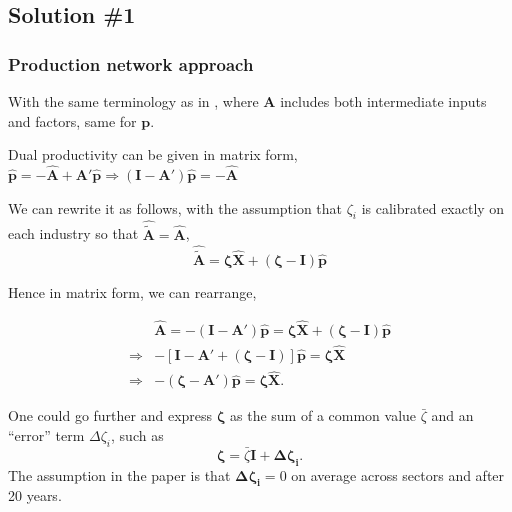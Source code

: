 \documentclass[11pt]{article}
\begin{document}

\subsection{Solution \#1}
\subsubsection{Production network approach}

With the same terminology as in \cite{mcnerneyHowProductionNetworks2022}, where $\mathbf{A}$ includes both intermediate inputs and factors, same for $\mathbf{p}$.

Dual productivity can be given in matrix form,
$   \mathbf{\hat{p}}=-\mathbf{\hat{A}} + \mathbf{A}'\mathbf{\hat{p}} \Rightarrow
 (\mathbf{I}-\mathbf{A}')\mathbf{\hat{p}}=-\mathbf{\hat{A}} $

We can rewrite it as follows, with the assumption that $\zeta_i$ is calibrated exactly on each industry so that $\mathbf{\hat{\tilde{A}}}=\mathbf{\hat{A}}$,
\begin{equation*}
    \mathbf{\hat{\tilde{A}}}=\bm{\zeta} \mathbf{\hat{X}}+(\bm{\zeta}-\mathbf{I})\mathbf{\hat{p}} 
\end{equation*}

Hence in matrix form, we can rearrange,

\begin{align*}
    & \mathbf{\hat{A}}=- (\mathbf{I}-\mathbf{A}')\mathbf{\hat{p}} = \bm{\zeta} \mathbf{\hat{X}}+(\bm{\zeta}-\mathbf{I})\mathbf{\hat{p}} \\
    \Rightarrow& 
    - \left[\mathbf{I}-\mathbf{A}'+(\bm{\zeta}-\mathbf{I})\right]\mathbf{\hat{p}} = \bm{\zeta} \mathbf{\hat{X}} \\
     \Rightarrow &
    - (\bm{\zeta}-\mathbf{A}')\mathbf{\hat{p}} = \bm{\zeta} \mathbf{\hat{X}}.
\end{align*}


One could go further and express $\bm{\zeta}$ as the sum of a common value $\bar{\zeta}$ and an ``error'' term $\Delta \zeta_i$, such as 
\begin{equation*}
    \bm{\zeta}=\bar{\zeta}\mathbf{I}+\bm{\Delta \zeta_i}.
\end{equation*}
The assumption in the paper is that $\bm{\Delta \zeta_i}=0$ on average across sectors and after 20 years.

\vspace{3mm}
\end{document}
